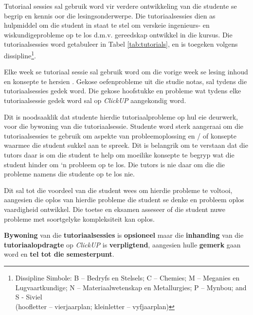         Tutoriaal sessies sal gebruik word vir verdere ontwikkeling van die
        studente se begrip en kennis oor die lesingsonderwerpe.  Die
        tutoriaalsessies dien as hulpmiddel om die student in staat te stel om
        verskeie ingenieurs- en wiskundigeprobleme op te los d.m.v. gereedskap
        ontwikkel in die kursus. Die tutoriaalsessies word getabuleer in Tabel
        \ref{tab:tutorials}, en is toegeken volgens
        dissipline\footnote{Dissipline Simbole:
            B -- Bedryfs en Stelsels;
            C -- Chemies;
            M -- Meganies en Lugvaartkundige;
            N -- Materiaalwetenskap en Metallurgies;
            P -- Mynbou; and S - Siviel \\
            (hoofletter -- vierjaarplan; kleinletter -- vyfjaarplan)}.

        Elke week se tutoriaal sessie sal gebruik word om die vorige week se
        lesing inhoud en konsepte te hersien . Gekose oefenprobleme uit die
        studie notas, sal tydens die tutoriaalsessies gedek word. Die gekose
        hoofstukke en probleme wat tydens elke tutoriaalsessie gedek word sal
        op {\it ClickUP} aangekondig word.

        Dit is noodsaaklik dat studente hierdie tutoriaalprobleme op hul eie
        deurwerk, voor die bywoning van die tutoriaalsessie. Studente word
        sterk aangeraai om die tutoriaalsessies te gebruik om aspekte van
        probleemoplossing en / of konsepte waarmee die student sukkel aan te
        spreek. Dit is belangrik om te verstaan dat die tutors daar is om die
        student te help om moeilike konsepte te begryp wat die student hinder
        om `n probleem op te los. Die tutors is nie daar om die die probleme
        namens die studente op te los nie.

        Dit sal tot die voordeel van die student wees om hierdie probleme te
        voltooi, aangesien die oplos van hierdie probleme die student se denke
        en probleem oplos vaardigheid ontwikkel.  Die toetse en eksamen
        asseseer of die student nuwe probleme met soortgelyke kompleksiteit kan
        oplos.

        \textbf{Bywoning} van die \textbf{tutoriaalsessies} is
        \textbf{opsioneel} maar die \textbf{inhanding} van die
        \textbf{tutoriaalopdragte} op {\it ClickUP} is \textbf{verpligtend},
        aangesien hulle \textbf{gemerk} gaan word en \textbf{tel tot die
        semesterpunt}.
